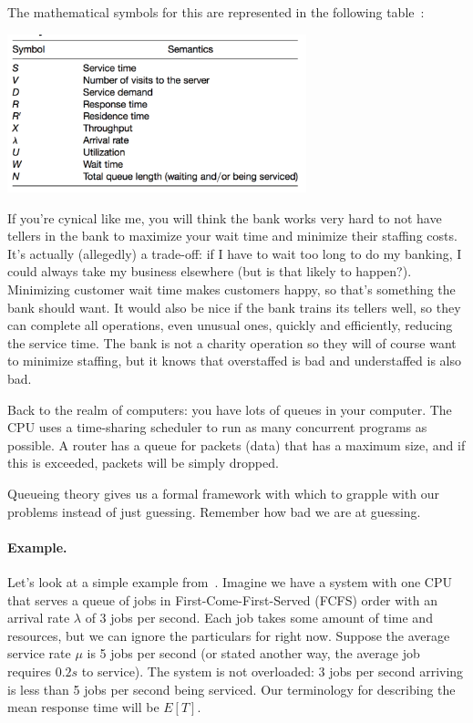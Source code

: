 \documentclass[a4paper]{report}
\begin{document}
The mathematical symbols for this are represented in the following table~\cite{swps}:


\begin{center}
	\includegraphics[width=0.65\textwidth]{images/math-symbols.png}
\end{center}

If you're cynical like me, you will think the bank works very hard to not have tellers in the bank to maximize your wait time and minimize their staffing costs. It's actually (allegedly) a trade-off: if I have to wait too long to do my banking, I could always take my business elsewhere (but is that likely to happen?). Minimizing customer wait time makes customers happy, so that's something the bank should want. It would also be nice if the bank trains its tellers well, so they can complete all operations, even unusual ones, quickly and efficiently, reducing the service time. The bank is not a charity operation so they will of course want to minimize staffing, but it knows that overstaffed is bad and understaffed is also bad. 

Back to the realm of computers: you have lots of queues in your computer. The CPU uses a time-sharing scheduler to run as many concurrent programs as possible. A router has a queue for packets (data) that has a maximum size, and if this is exceeded, packets will be simply dropped. 

Queueing theory gives us a formal framework with which to grapple with our problems instead of just guessing. Remember how bad we are at guessing. 


\paragraph{Example.} Let's look at a simple example from~\cite{pmd}. Imagine we have a system with one CPU that serves a queue of jobs in First-Come-First-Served (FCFS) order with an arrival rate $\lambda$ of 3 jobs per second. Each job takes some amount of time and resources, but we can ignore the particulars for right now. Suppose the average service rate $\mu$ is 5 jobs per second (or stated another way, the average job requires $0.2s$ to service). The system is not overloaded: 3 jobs per second arriving is less than 5 jobs per second being serviced. Our terminology for describing the mean response time will be $E[T]$. 
\end{document}
